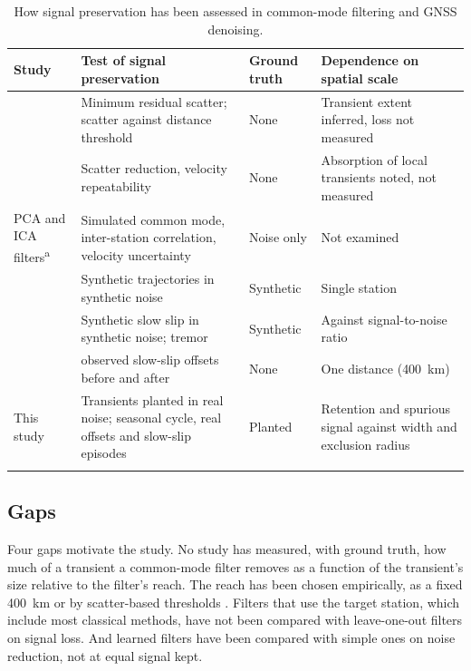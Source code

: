 \documentclass[preprint,12pt,authoryear]{elsarticle}
\begin{document}
\begin{table}[tbp]
  \centering
  \caption{How signal preservation has been assessed in common-mode filtering and GNSS denoising.}
  \label{tab:assessment}
  \small
  \begin{tabular}{>{\raggedright\arraybackslash}p{2.6cm} >{\raggedright\arraybackslash}p{3.9cm} >{\raggedright\arraybackslash}p{1.6cm} >{\raggedright\arraybackslash}p{3.7cm}}
    \toprule
    Study & Test of signal preservation & Ground truth & Dependence on spatial scale \\
    \midrule
    \citet{tianshen2016} & Minimum residual scatter; scatter against distance threshold & None & Transient extent inferred, loss not measured \\
    \citet{kreemer2021} & Scatter reduction, velocity repeatability & None & Absorption of local transients noted, not measured \\
    PCA and ICA filters\textsuperscript{a} & Simulated common mode, inter-station correlation, velocity uncertainty & Noise only & Not examined \\
    \citet{mastella2025} & Synthetic trajectories in synthetic noise & Synthetic & Single station \\
    \citet{costantino2024} & Synthetic slow slip in synthetic noise; tremor & Synthetic & Against signal-to-noise ratio \\
    \citet{bachelot2025} & 280 observed slow-slip offsets before and after & None & One distance (400~km) \\
    This study & Transients planted in real noise; seasonal cycle, real offsets and slow-slip episodes & Planted & Retention and spurious signal against width and exclusion radius \\
    \bottomrule
    \multicolumn{4}{p{12cm}}{\footnotesize \textsuperscript{a}\,\citet{shen2014, gruszczynski2018, li2020vbpca, zhou2022, liu2026}.}
  \end{tabular}
\end{table}

\subsection{Gaps}

Four gaps motivate the study. No study has measured, with ground truth, how much of a transient a common-mode filter removes as a function of the transient's size relative to the filter's reach. The reach has been chosen empirically, as a fixed 400~km \citep{bachelot2025} or by scatter-based thresholds \citep{tianshen2016}. Filters that use the target station, which include most classical methods, have not been compared with leave-one-out filters on signal loss. And learned filters have been compared with simple ones on noise reduction, not at equal signal kept.
\end{document}
